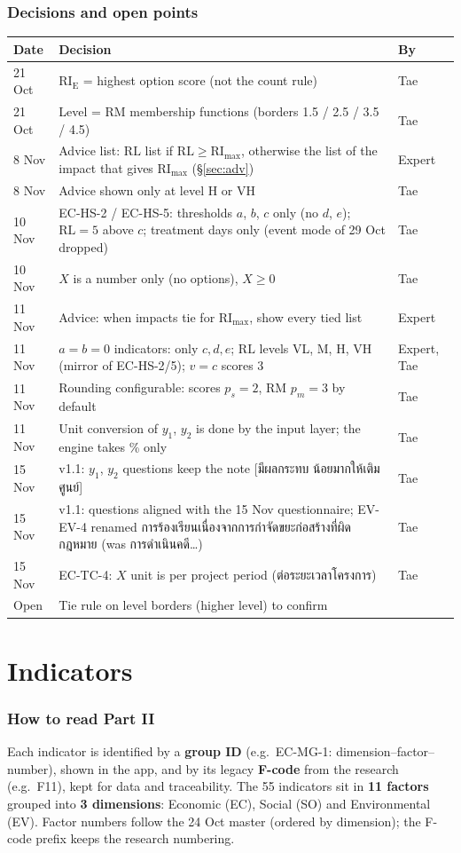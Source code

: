 \documentclass[10pt,a4paper]{article}
\newcommand{\RL}{\mathrm{RL}}\newcommand{\RIC}{\mathrm{RI_C}}\newcommand{\RIT}{\mathrm{RI_T}}\newcommand{\RIE}{\mathrm{RI_E}}
\newcommand{\RImax}{\mathrm{RI}_{\max}}\newcommand{\RM}{\mathrm{RM}}
\begin{document}
\section{Decisions and open points}
\begin{tabularx}{\linewidth}{@{}l X l@{}}
\toprule
Date & Decision & By\\\midrule
21 Oct & $\RIE$ = highest option score (not the count rule) & Tae\\
21 Oct & Level = RM membership functions (borders 1.5 / 2.5 / 3.5 / 4.5) & Tae\\
8 Nov & Advice list: $\RL$ list if $\RL\ge\RImax$, otherwise the list of the impact that gives $\RImax$ (§\ref{sec:adv}) & Expert\\
8 Nov & Advice shown only at level H or VH & Tae\\
10 Nov & EC-HS-2 / EC-HS-5: thresholds $a$, $b$, $c$ only (no $d$, $e$); $\RL=5$ above $c$; treatment days only (event mode of 29 Oct dropped) & Tae\\
10 Nov & $X$ is a number only (no options), $X\ge0$ & Tae\\
11 Nov & Advice: when impacts tie for $\RImax$, show every tied list & Expert\\
11 Nov & $a=b=0$ indicators: only $c,d,e$; $\RL$ levels VL, M, H, VH (mirror of EC-HS-2/5); $v=c$ scores 3 & Expert, Tae\\
11 Nov & Rounding configurable: scores $p_s=2$, $\RM$ $p_m=3$ by default & Tae\\
11 Nov & Unit conversion of $y_1$, $y_2$ is done by the input layer; the engine takes \% only & Tae\\
15 Nov & v1.1: $y_1$, $y_2$ questions keep the note [มีผลกระทบ น้อยมากให้เติม ศูนย์] & Tae\\
15 Nov & v1.1: questions aligned with the 15 Nov questionnaire; EV-EV-4 renamed การร้องเรียนเนื่องจากการกำจัดขยะก่อสร้างที่ผิดกฎหมาย (was การดำเนินคดี…) & Tae\\
15 Nov & EC-TC-4: $X$ unit is per project period (ต่อระยะเวลาโครงการ) & Tae\\
\midrule
Open & Tie rule on level borders (higher level) to confirm & \\
\bottomrule
\end{tabularx}

\clearpage\part{Indicators}
\section{How to read Part II}
Each indicator is identified by a \textbf{group ID} (e.g.\ EC-MG-1: dimension–factor–number), shown in the app, and by its legacy \textbf{F-code} from the research (e.g.\ F11), kept for data and traceability. The 55 indicators sit in \textbf{11 factors} grouped into \textbf{3 dimensions}: Economic (EC), Social (SO) and Environmental (EV). Factor numbers follow the 24 Oct master (ordered by dimension); the F-code prefix keeps the research numbering.
\end{document}
